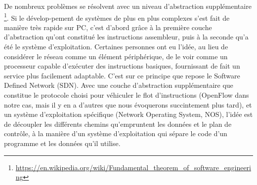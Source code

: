 De nombreux problèmes se résolvent avec un niveau d'abstraction supplémentaire \footnote{\label{indirection}\url{https://en.wikipedia.org/wiki/Fundamental_theorem_of_software_engineering}}. Si le dévelop-pement de systèmes de plus en plus complexes s'est fait de manière très rapide sur PC, c'est d'abord grâce à la première couche d'abstraction qu'ont constitué les instructions assembleur, puis à la seconde qu'a été le système d'exploitation. Certaines personnes ont eu l'idée, au lieu de considérer le réseau comme un élément périphérique, de le voir comme un processeur capable d'exécuter des instructions basiques, fournissant de fait un service plus facilement adaptable. C'est sur ce principe que repose le Software Defined Network (SDN). Avec une couche d'abstraction supplémentaire que constitue le protocole choisi pour véhiculer le flot d'instructions (OpenFlow dans notre cas, mais il y en a d'autres que nous évoquerons succintement plus tard), et un système d'exploitation spécifique (Network Operating System, NOS), l'idée est de découpler les différents chemins qu'empruntent les données et le plan de contrôle, à la manière d'un système d'exploitation qui sépare le code d'un programme et les données qu'il utilise.